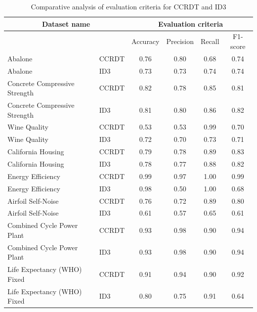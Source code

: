 \documentclass[twoside]{article}
\begin{document}
\begin{table}[h!]
\tiny
\centering
\caption{Comparative analysis of evaluation criteria for CCRDT and ID3}
\label{tab:ccrdt_id3}
\begin{tabular}{|l|l|c|c|c|c|}
\hline
\multicolumn{2}{|c|}{Dataset name} & \multicolumn{4}{c|}{Evaluation criteria} \\
\hline
\multicolumn{2}{|c|}{} & Accuracy & Precision & Recall & F1-score \\
\hline
Abalone & CCRDT & 0.76 & 0.80 & 0.68 & 0.74 \\
\hline
Abalone & ID3 & 0.73 & 0.73 & 0.74 & 0.74 \\
\hline
Concrete Compressive Strength & CCRDT & 0.82 & 0.78 & 0.85 & 0.81 \\
\hline
Concrete Compressive Strength & ID3 & 0.81 & 0.80 & 0.86 & 0.82 \\
\hline
Wine Quality & CCRDT & 0.53 & 0.53 & 0.99 & 0.70 \\
\hline
Wine Quality & ID3 & 0.72 & 0.70 & 0.73 & 0.71 \\
\hline
California Housing & CCRDT & 0.79 & 0.78 & 0.89 & 0.83 \\
\hline
California Housing & ID3 & 0.78 & 0.77 & 0.88 & 0.82 \\
\hline
Energy Efficiency & CCRDT & 0.99 & 0.97 & 1.00 & 0.99 \\
\hline
Energy Efficiency & ID3 & 0.98 & 0.50 & 1.00 & 0.68 \\
\hline
Airfoil Self-Noise & CCRDT & 0.76 & 0.72 & 0.89 & 0.80 \\
\hline
Airfoil Self-Noise & ID3 & 0.61 & 0.57 & 0.65 & 0.61 \\
\hline
Combined Cycle Power Plant & CCRDT & 0.93 & 0.98 & 0.90 & 0.94 \\
\hline
Combined Cycle Power Plant & ID3 & 0.93 & 0.98 & 0.90 & 0.94 \\
\hline
Life Expectancy (WHO) Fixed & CCRDT & 0.91 & 0.94 & 0.90 & 0.92 \\
\hline
Life Expectancy (WHO) Fixed & ID3 & 0.80 & 0.75 & 0.91 & 0.64 \\
\hline
\end{tabular}
\end{table}
\end{document}
